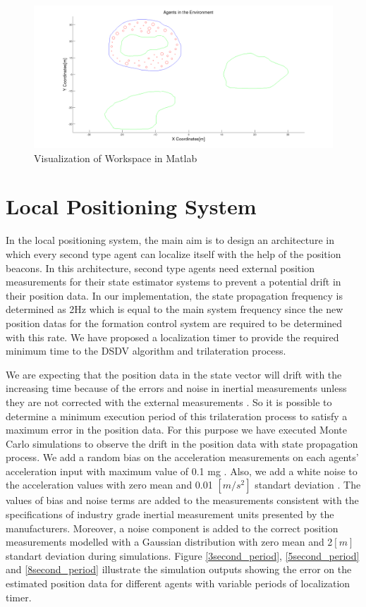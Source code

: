\begin{figure}[H]
\caption{Visualization of Workspace in Matlab} \label{Matlab_env}
\centerline{\includegraphics[scale = 0.30]{2}}
\end{figure} 
    
\section{Local Positioning System} \label{lps_ref}
In the local positioning system, the main aim is to design an architecture in which every second type agent can localize itself with the help of the position beacons. In this architecture, second type agents need external position measurements for their state estimator systems to prevent a potential drift in their position data. In our implementation, the state propagation frequency is determined as 2Hz which is equal to the main system frequency since the new position datas for the formation control system are required to be determined with this rate. 	We have proposed a  localization timer to provide the required minimum time to the DSDV algorithm and trilateration process.

We are expecting that the position data in the state vector will drift with the increasing time because of the errors and noise in inertial measurements unless they are not corrected with the external measurements \cite{91}. So it is possible to determine a minimum execution period of this trilateration process to satisfy a maximum error in the position data. For this purpose we have executed Monte Carlo simulations to observe the drift in the position data with state propagation process. We add a random bias on the acceleration measurements on each agents' acceleration input with maximum value of 0.1 mg \cite{bias}. Also, we add a white noise to the acceleration values with zero mean and 0.01 $[m/s^2]$ standart deviation \cite{noise}. The values of bias and noise terms are added to the measurements consistent with the specifications of industry grade inertial measurement units presented by the manufacturers. Moreover, a noise component is added to the correct position measurements modelled with a Gaussian distribution with zero mean and 2$[m]$ standart deviation during simulations. Figure \ref{3second_period}, \ref{5second_period} and \ref{8second_period} illustrate the simulation outputs showing the error on the estimated position data for different agents with variable periods of localization timer.
		
